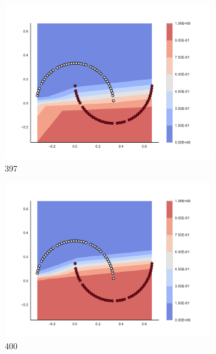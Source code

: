 \begin{figure}[h]
\begin{subfigure}[b]{0.09\textwidth}
    \includegraphics[clip, trim=2.35cm 1.75cm 4.5cm 0cm,width=\textwidth]{img/convergence/397.pdf}
    \caption{397}
    \label{fig:convergence_397}
\end{subfigure}
%
\begin{subfigure}[b]{0.09\textwidth}
    \includegraphics[clip, trim=2.35cm 1.75cm 4.5cm 0cm,width=\textwidth]{img/convergence/400.pdf}
    \caption{400}
    \label{fig:convergence_400}
\end{subfigure}
%
\begin{subfigure}[b]{0.09\textwidth}

\end{subfigure}
\end{figure}
